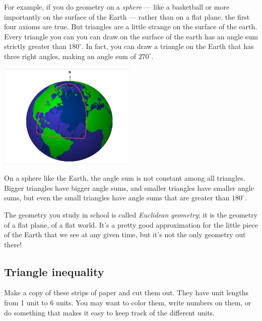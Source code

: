 For example, if you do geometry on a \emph{sphere} --- like a basketball or more importantly on the surface of the Earth --- rather than on a flat plane, the first four axioms are true.  But  triangles are a little strange on the surface of the earth.  Every triangle you can you can draw on the surface of the earth has an angle sum strictly greater than $180^\circ$.     In fact, you can draw a triangle on the Earth that has three right angles, making an angle sum of $270^\circ$.  


\begin{center}
\includegraphics[height=5cm]{earthtri}
\end{center}
On a sphere like the Earth, the angle sum is not constant among all triangles.  Bigger triangles have bigger angle sums, and smaller triangles have smaller angle sums, but even the small triangles have angle sums that are greater than $180^\circ$.


The geometry you study in school is called \emph{Euclidean geometry}; it is the geometry of a flat plane, of a flat world.  It's a pretty good approximation for the little piece of the Earth that we see at any given time, but it's not the only geometry out there!


\newpage

\subsection{Triangle inequality}
Make a copy of these strips of paper and cut them out.  They have unit lengths from 1 unit to 6 units.  You may want to color them, write numbers on them, or do something that makes it easy to keep track of the different units.



